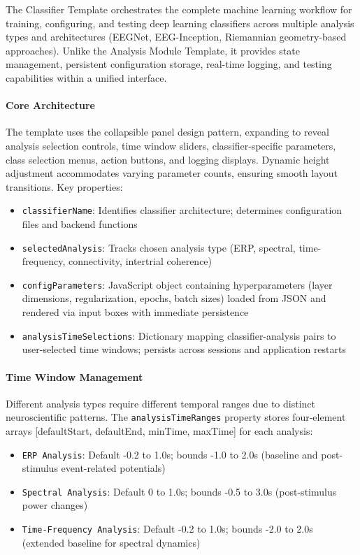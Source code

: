 \documentclass[12pt]{report}
\begin{document}
The Classifier Template orchestrates the complete machine learning workflow for training, configuring, and testing deep learning classifiers across multiple analysis types and architectures (EEGNet, EEG-Inception, Riemannian geometry-based approaches). Unlike the Analysis Module Template, it provides state management, persistent configuration storage, real-time logging, and testing capabilities within a unified interface.

\paragraph{Core Architecture}\mbox{}

The template uses the collapsible panel design pattern, expanding to reveal analysis selection controls, time window sliders, classifier-specific parameters, class selection menus, action buttons, and logging displays. Dynamic height adjustment accommodates varying parameter counts, ensuring smooth layout transitions. Key properties:

\begin{itemize}
\item \verb|classifierName|: Identifies classifier architecture; determines configuration files and backend functions
\item \verb|selectedAnalysis|: Tracks chosen analysis type (ERP, spectral, time-frequency, connectivity, intertrial coherence)
\item \verb|configParameters|: JavaScript object containing hyperparameters (layer dimensions, regularization, epochs, batch sizes) loaded from JSON and rendered via input boxes with immediate persistence
\item \verb|analysisTimeSelections|: Dictionary mapping classifier-analysis pairs to user-selected time windows; persists across sessions and application restarts
\end{itemize}

\paragraph{Time Window Management}\mbox{}

Different analysis types require different temporal ranges due to distinct neuroscientific patterns. The \verb|analysisTimeRanges| property stores four-element arrays [defaultStart, defaultEnd, minTime, maxTime] for each analysis:

\begin{itemize}
\item \verb|ERP Analysis|: Default -0.2 to 1.0s; bounds -1.0 to 2.0s (baseline and post-stimulus event-related potentials)
\item \verb|Spectral Analysis|: Default 0 to 1.0s; bounds -0.5 to 3.0s (post-stimulus power changes)
\item \verb|Time-Frequency Analysis|: Default -0.2 to 1.0s; bounds -2.0 to 2.0s (extended baseline for spectral dynamics)
\end{itemize}
\end{document}
